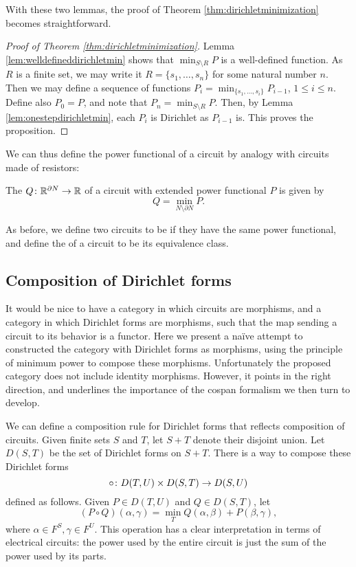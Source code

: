 With these two lemmas, the proof of Theorem \ref{thm:dirichletminimization}
becomes straightforward.

\begin{proof}[Proof of Theorem \ref{thm:dirichletminimization}]
  Lemma \ref{lem:welldefineddirichletmin} shows that $\min_{S \setminus R}P$ is a well-defined
  function. As $R$ is a finite set, we may write it $R = \{s_1,\dots, s_n\}$ for
  some natural number $n$. Then we may define a sequence of functions $P_i =
  \min_{\{s_1, \dots,s_i\}} P_{i-1}$, $1 \le i\le n$. Define also $P_0 = P$, and note
  that $P_n = \min_{S \setminus R}P$. Then, by Lemma
  \ref{lem:onestepdirichletmin}, each $P_i$ is Dirichlet as $P_{i-1}$
  is. This proves the proposition.
\end{proof}

We can thus define the power functional of a circuit by analogy with circuits made
of resistors:

\begin{definition}
The  $Q {\colon} {\mathbb{R}}^{\partial N} \to {\mathbb{R}}$ of a circuit with extended power functional $P$ is given by
\[
 Q = \min_{N \setminus \partial N}  P .
\]
\end{definition}

As before, we define two circuits to be  if they have the same
power functional, and define the  of a circuit to be its equivalence
class.  

\subsection{Composition of Dirichlet forms}

It would be nice to have a category in which circuits are morphisms, and a
category in which Dirichlet forms are morphisms, such that the map sending
a circuit to its behavior is a functor.  Here we present a na\"ive attempt to
constructed the category with Dirichlet forms as morphisms, using the principle
of minimum power to compose these morphisms.  Unfortunately the proposed category does not include identity morphisms.  However, it points in the right direction, and underlines the importance of the cospan formalism we then turn to develop.

We can define a composition rule for Dirichlet forms that reflects composition of circuits.
Given finite sets $S$ and $T$, let $S+T$ denote their disjoint union.  Let
$D(S,T)$ be the set of Dirichlet forms on $S+T$. There is a way
to compose these Dirichlet forms
\[ 
\circ {\colon} D(T,U) \times D(S,T) \to D(S,U) 
\]
defined as follows.  Given $P \in D(T,U)$ and $Q \in D(S,T)$, let
\[ 
  (P \circ Q)(\alpha, \gamma) = \min_{T} Q(\alpha, \beta) + P(\beta, \gamma),
\]
where $\alpha \in F^S, \gamma \in F^U$. This operation has a clear
interpretation in terms of electrical circuits: the power used by the entire
circuit is just the sum of the power used by its parts. 

